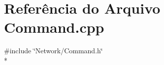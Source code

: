\section{Referência do Arquivo Command.\+cpp}
\label{_command_8cpp}
{\ttfamily \#include \char`\"{}Network/\+Command.\+h\char`\"{}}\\*
